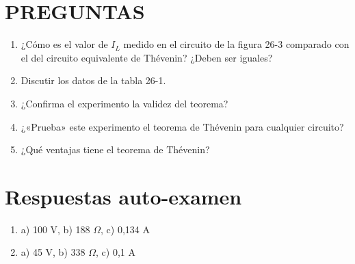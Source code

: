 \documentclass[a4paper,12pt]{article}
\begin{document}
\section{PREGUNTAS}
\begin{enumerate}
\item ¿Cómo es el valor de $I_L$ medido en el circuito de la figura 26-3 comparado con el del circuito equivalente de Thévenin? ¿Deben ser iguales?
\item Discutir los datos de la tabla 26-1.
\item ¿Confirma el experimento la validez del teorema?
\item ¿«Prueba» este experimento el teorema de Thévenin para cualquier circuito?
\item ¿Qué ventajas tiene el teorema de Thévenin?
\end{enumerate}

\section{Respuestas auto-examen}
\begin{enumerate}
\item a) 100 V, b) 188 $\Omega$, c) 0,134 A
\item a) 45 V, b) 338 $\Omega$, c) 0,1 A
\end{enumerate}
\end{document}
